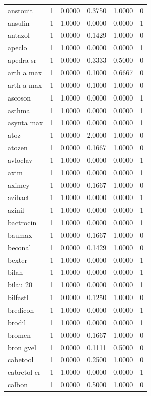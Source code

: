 \begin{longtable}{p{3.0cm}rrrrr}
anstouit & 1 & 0.0000 & 0.3750 & 1.0000 & 0 \\
ansulin & 1 & 1.0000 & 0.0000 & 0.0000 & 1 \\
antazol & 1 & 0.0000 & 0.1429 & 1.0000 & 0 \\
apeclo & 1 & 1.0000 & 0.0000 & 0.0000 & 1 \\
apedra sr & 1 & 0.0000 & 0.3333 & 0.5000 & 0 \\
arth a max & 1 & 0.0000 & 0.1000 & 0.6667 & 0 \\
arth-a max & 1 & 0.0000 & 0.1000 & 1.0000 & 0 \\
ascoson & 1 & 1.0000 & 0.0000 & 0.0000 & 1 \\
asthma & 1 & 1.0000 & 0.0000 & 0.0000 & 1 \\
asynta max & 1 & 1.0000 & 0.0000 & 0.0000 & 1 \\
atoz & 1 & 0.0000 & 2.0000 & 1.0000 & 0 \\
atozen & 1 & 0.0000 & 0.1667 & 1.0000 & 0 \\
avloclav & 1 & 1.0000 & 0.0000 & 0.0000 & 1 \\
axim & 1 & 1.0000 & 0.0000 & 0.0000 & 1 \\
aximcy & 1 & 0.0000 & 0.1667 & 1.0000 & 0 \\
azibact & 1 & 1.0000 & 0.0000 & 0.0000 & 1 \\
azinil & 1 & 1.0000 & 0.0000 & 0.0000 & 1 \\
bactrocin & 1 & 1.0000 & 0.0000 & 0.0000 & 1 \\
baumax & 1 & 0.0000 & 0.1667 & 1.0000 & 0 \\
beconal & 1 & 0.0000 & 0.1429 & 1.0000 & 0 \\
bexter & 1 & 1.0000 & 0.0000 & 0.0000 & 1 \\
bilan & 1 & 1.0000 & 0.0000 & 0.0000 & 1 \\
bilau 20 & 1 & 1.0000 & 0.0000 & 0.0000 & 1 \\
bilfastl & 1 & 0.0000 & 0.1250 & 1.0000 & 0 \\
bredicon & 1 & 1.0000 & 0.0000 & 0.0000 & 1 \\
brodil & 1 & 1.0000 & 0.0000 & 0.0000 & 1 \\
bromen & 1 & 0.0000 & 0.1667 & 1.0000 & 0 \\
bron gvel & 1 & 0.0000 & 0.1111 & 0.5000 & 0 \\
cabetool & 1 & 0.0000 & 0.2500 & 1.0000 & 0 \\
cabretol cr & 1 & 1.0000 & 0.0000 & 0.0000 & 1 \\
calbon & 1 & 0.0000 & 0.5000 & 1.0000 & 0 \\

\end{longtable}
